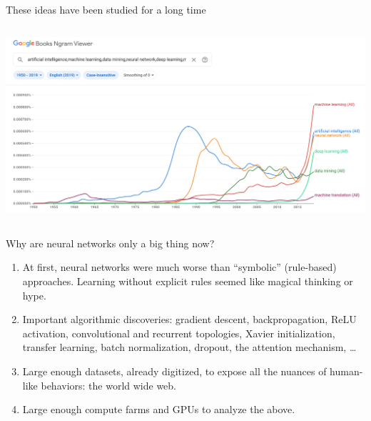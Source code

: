 \documentclass[aspectratio=169]{beamer}
\begin{document}
\begin{frame}{These ideas have been studied for a long time}
\vspace{0.2 cm}
\begin{columns}
\includegraphics[width=\linewidth]{ups-and-downs-of-ai.png}
\end{columns}
\end{frame}

\begin{frame}{Why are neural networks only a big thing now?}
\vspace{0.5 cm}
\begin{enumerate}\setlength{\itemsep}{0.5 cm}
\item<1-> At first, neural networks were much worse than ``symbolic'' (rule-based) approaches. Learning without explicit rules seemed like magical thinking or hype.

\item<2-> Important algorithmic discoveries: gradient descent, backpropagation, ReLU activation, convolutional and recurrent topologies, Xavier initialization, transfer learning, batch normalization, dropout, the attention mechanism, \ldots

\item<3-> Large enough datasets, already digitized, to expose all the nuances of human-like behaviors: the world wide web.

\item<4-> Large enough compute farms and GPUs to analyze the above.
\end{enumerate}
\end{frame}
\end{document}
